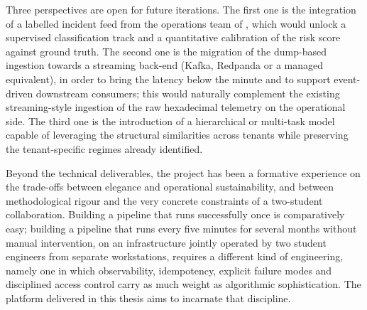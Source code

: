 Three perspectives are open for future iterations. The first one is the integration of a labelled incident feed from the operations team of \hostorg, which would unlock a supervised classification track and a quantitative calibration of the risk score against ground truth. The second one is the migration of the dump-based ingestion towards a streaming back-end (Kafka, Redpanda or a managed equivalent), in order to bring the latency below the minute and to support event-driven downstream consumers; this would naturally complement the existing streaming-style ingestion of the raw hexadecimal telemetry on the operational side. The third one is the introduction of a hierarchical or multi-task model capable of leveraging the structural similarities across tenants while preserving the tenant-specific regimes already identified.

Beyond the technical deliverables, the project has been a formative experience on the trade-offs between elegance and operational sustainability, and between methodological rigour and the very concrete constraints of a two-student collaboration. Building a pipeline that runs successfully once is comparatively easy; building a pipeline that runs every five minutes for several months without manual intervention, on an infrastructure jointly operated by two student engineers from separate workstations, requires a different kind of engineering, namely one in which observability, idempotency, explicit failure modes and disciplined access control carry as much weight as algorithmic sophistication. The platform delivered in this thesis aims to incarnate that discipline.

\cleardoublepage
